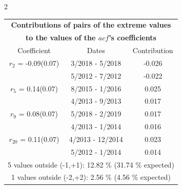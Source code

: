 
\thispagestyle{empty}
\begin{multicols}{2}{ 
\begin{tabular}{ccc}
\multicolumn{3}{c}{\textbf{Contributions of pairs of the extreme values} }  \vspace{-.10in}  \\ 
\multicolumn{3}{c}{ \textbf{to the values of the $acf$'s coefficients}} \\ 
\hline 
\hline                  Coefficient  &  Dates &  Contribution \\ 
\hline 
  $r_{ 2}$ = -0.09(0.07) &       3/2018 -  5/2018 &       -0.026    \vspace{-.10in} \\ 
  &        5/2012 -  7/2012 &       -0.022  \vspace{-.02in}   \\ \hline 
    $r_{ 5}$ = 0.14(0.07) &       8/2015 -  1/2016 &        0.025   \vspace{-.10in} \\  
&        4/2013 -  9/2013 &        0.017  \vspace{-.02in} \\ \hline 
  $r_{ 9}$ = 0.08(0.07) &       5/2018 -  2/2019 &        0.017   \vspace{-.10in} \\  
&        4/2013 -  1/2014 &        0.016  \vspace{-.02in} \\ \hline 
  $r_{20}$ = 0.11(0.07) &       4/2013 - 12/2014 &        0.023   \vspace{-.10in} \\  
&        5/2012 -  1/2014 &        0.014  \vspace{-.02in} \\ \hline 
\multicolumn{3}{c}{               5 values outside (-1,+1): 12.82  \% (31.74  \% expected)}\vspace{-.10in} \\ 
\multicolumn{3}{c}{               1 values outside (-2,+2):  2.56 \%  (4.56 \% expected) } \\
 \end{tabular} \\ 
 } 
\end{multicols} 
